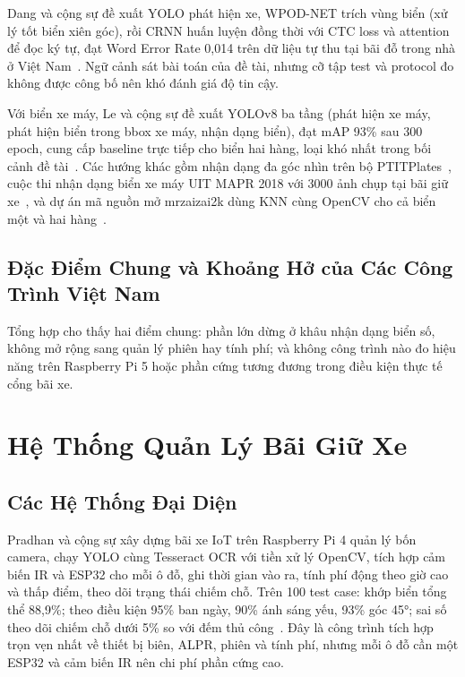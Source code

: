 Dang và cộng sự đề xuất YOLO phát hiện xe, WPOD-NET trích vùng biển (xử lý tốt biển xiên
góc), rồi CRNN huấn luyện đồng thời với CTC loss và attention để đọc ký tự, đạt Word Error
Rate 0,014 trên dữ liệu tự thu tại bãi đỗ trong nhà ở Việt
Nam~\autocite{dang2024vietnamcrnn}. Ngữ cảnh sát bài toán của đề tài, nhưng cỡ tập test và
protocol đo không được công bố nên khó đánh giá độ tin cậy.

Với biển xe máy, Le và cộng sự đề xuất YOLOv8 ba tầng (phát hiện xe máy, phát hiện biển
trong bbox xe máy, nhận dạng biển), đạt mAP 93\% sau 300 epoch, cung cấp baseline trực
tiếp cho biển hai hàng, loại khó nhất trong bối cảnh đề tài~\autocite{le2023motorcycleplate}.
Các hướng khác gồm nhận dạng đa góc nhìn trên bộ PTITPlates~\autocite{trananh2023multiangle},
cuộc thi nhận dạng biển xe máy UIT MAPR 2018 với 3000 ảnh chụp tại bãi giữ
xe~\autocite{mapr2018challenge}, và dự án mã nguồn mở mrzaizai2k dùng KNN cùng OpenCV cho
cả biển một và hai hàng~\autocite{mrzaizai2k2025vnplate}.

\subsection{Đặc Điểm Chung và Khoảng Hở của Các Công Trình Việt Nam}

Tổng hợp cho thấy hai điểm chung: phần lớn dừng ở khâu nhận dạng biển số, không mở rộng
sang quản lý phiên hay tính phí; và không công trình nào đo hiệu năng trên Raspberry Pi 5
hoặc phần cứng tương đương trong điều kiện thực tế cổng bãi xe.

\section{Hệ Thống Quản Lý Bãi Giữ Xe}

\subsection{Các Hệ Thống Đại Diện}

Pradhan và cộng sự xây dựng bãi xe IoT trên Raspberry Pi 4 quản lý bốn camera, chạy YOLO
cùng Tesseract OCR với tiền xử lý OpenCV, tích hợp cảm biến IR và ESP32 cho mỗi ô đỗ, ghi
thời gian vào ra, tính phí động theo giờ cao và thấp điểm, theo dõi trạng thái chiếm chỗ.
Trên 100 test case: khớp biển tổng thể 88,9\%; theo điều kiện 95\% ban ngày, 90\% ánh
sáng yếu, 93\% góc 45°; sai số theo dõi chiếm chỗ dưới 5\% so với đếm thủ
công~\autocite{pradhan2025iotparking}. Đây là công trình tích hợp trọn vẹn nhất về thiết bị
biên, ALPR, phiên và tính phí, nhưng mỗi ô đỗ cần một ESP32 và cảm biến IR nên chi phí
phần cứng cao.

